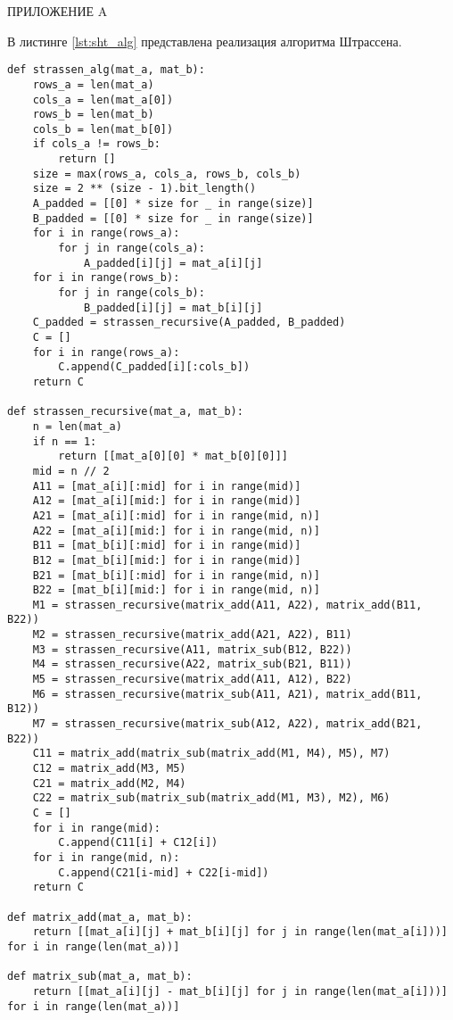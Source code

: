 \begin{appendix}
	\begin{center}
		ПРИЛОЖЕНИЕ A
	\end{center}

В листинге \ref{lst:sht_alg} представлена реализация алгоритма Штрассена.
	\begin{center}
		\captionsetup{justification=raggedright,singlelinecheck=off}
	\begin{lstlisting}[label=lst:sht_alg,caption=Алгоритм Штрассена]
def strassen_alg(mat_a, mat_b):
	rows_a = len(mat_a)
	cols_a = len(mat_a[0])
	rows_b = len(mat_b)
	cols_b = len(mat_b[0])
	if cols_a != rows_b:
		return []
	size = max(rows_a, cols_a, rows_b, cols_b)
	size = 2 ** (size - 1).bit_length()
	A_padded = [[0] * size for _ in range(size)]
	B_padded = [[0] * size for _ in range(size)]
	for i in range(rows_a):
		for j in range(cols_a):
			A_padded[i][j] = mat_a[i][j]
	for i in range(rows_b):
		for j in range(cols_b):
			B_padded[i][j] = mat_b[i][j]
	C_padded = strassen_recursive(A_padded, B_padded)
	C = []
	for i in range(rows_a):
		C.append(C_padded[i][:cols_b])
	return C
	
def strassen_recursive(mat_a, mat_b):
	n = len(mat_a)
	if n == 1:
		return [[mat_a[0][0] * mat_b[0][0]]]
	mid = n // 2
	A11 = [mat_a[i][:mid] for i in range(mid)]
	A12 = [mat_a[i][mid:] for i in range(mid)]
	A21 = [mat_a[i][:mid] for i in range(mid, n)]
	A22 = [mat_a[i][mid:] for i in range(mid, n)]
	B11 = [mat_b[i][:mid] for i in range(mid)]
	B12 = [mat_b[i][mid:] for i in range(mid)]
	B21 = [mat_b[i][:mid] for i in range(mid, n)]
	B22 = [mat_b[i][mid:] for i in range(mid, n)]
	M1 = strassen_recursive(matrix_add(A11, A22), matrix_add(B11, B22))
	M2 = strassen_recursive(matrix_add(A21, A22), B11)
	M3 = strassen_recursive(A11, matrix_sub(B12, B22))
	M4 = strassen_recursive(A22, matrix_sub(B21, B11))
	M5 = strassen_recursive(matrix_add(A11, A12), B22)
	M6 = strassen_recursive(matrix_sub(A11, A21), matrix_add(B11, B12))
	M7 = strassen_recursive(matrix_sub(A12, A22), matrix_add(B21, B22))
	C11 = matrix_add(matrix_sub(matrix_add(M1, M4), M5), M7)
	C12 = matrix_add(M3, M5)
	C21 = matrix_add(M2, M4)
	C22 = matrix_sub(matrix_sub(matrix_add(M1, M3), M2), M6)
	C = []
	for i in range(mid):
		C.append(C11[i] + C12[i])
	for i in range(mid, n):
		C.append(C21[i-mid] + C22[i-mid])
	return C
	
def matrix_add(mat_a, mat_b):
	return [[mat_a[i][j] + mat_b[i][j] for j in range(len(mat_a[i]))] for i in range(len(mat_a))]
	
def matrix_sub(mat_a, mat_b):
	return [[mat_a[i][j] - mat_b[i][j] for j in range(len(mat_a[i]))] for i in range(len(mat_a))]
	\end{lstlisting}
\end{center}
\end{appendix}